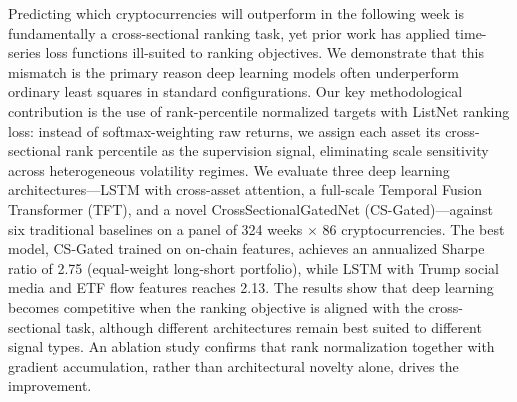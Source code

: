 Predicting which cryptocurrencies will outperform in the following week
is fundamentally a cross-sectional ranking task, yet prior work has
applied time-series loss functions ill-suited to ranking objectives.
We demonstrate that this mismatch is the primary reason deep learning
models often underperform ordinary least squares in standard configurations.
%
Our key methodological contribution is the use of rank-percentile
normalized targets with ListNet ranking loss: instead of softmax-weighting
raw returns, we assign each asset its cross-sectional rank percentile as
the supervision signal, eliminating scale sensitivity across heterogeneous
volatility regimes.
%
We evaluate three deep learning architectures—LSTM with cross-asset
attention, a full-scale Temporal Fusion Transformer (TFT), and a novel
CrossSectionalGatedNet (CS-Gated)—against six traditional baselines on
a panel of 324 weeks $\times$ 86 cryptocurrencies.
%
The best model, CS-Gated trained on on-chain features, achieves an
annualized Sharpe ratio of 2.75 (equal-weight long-short portfolio),
while LSTM with Trump social media and ETF flow features reaches 2.13.
The results show that deep learning becomes competitive when the ranking
objective is aligned with the cross-sectional task, although different
architectures remain best suited to different signal types.
An ablation study confirms that rank normalization together with gradient
accumulation, rather than architectural novelty alone, drives the improvement.
